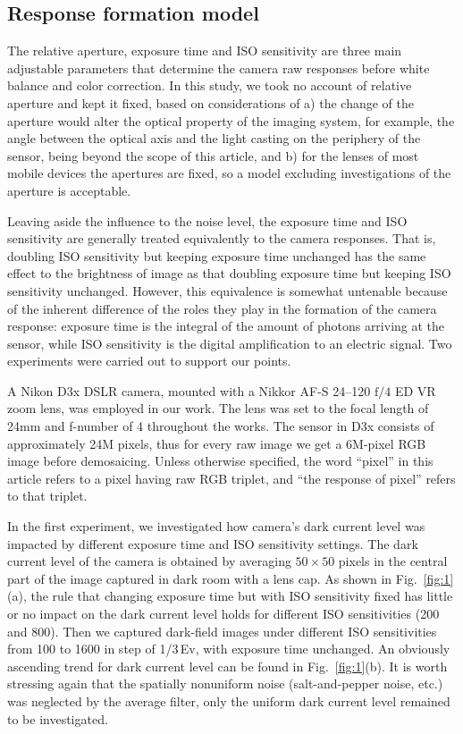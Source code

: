 \documentclass[9pt,twocolumn,twoside]{osajnl}
\begin{document}
	\subsection{Response formation model}\label{sec:response formation model}
	
	The relative aperture, exposure time and ISO sensitivity are three main adjustable parameters that determine the camera raw responses before white balance and color correction. In this study, we took no account of relative aperture and kept it fixed, based on considerations of a) the change of the aperture would alter the optical property of the imaging system, for example, the angle between the optical axis and the light casting on the periphery of the sensor, being beyond the scope of this article, and b) for the lenses of most mobile devices the apertures are fixed, so a model excluding investigations of the aperture is acceptable.
	
	Leaving aside the influence to the noise level, the exposure time and ISO sensitivity are generally treated equivalently to the camera responses. That is, doubling ISO sensitivity but keeping exposure time unchanged has the same effect to the brightness of image as that doubling exposure time but keeping ISO sensitivity unchanged. However, this equivalence is somewhat untenable because of the inherent difference of the roles they play in the formation of the camera response: exposure time is the integral of the amount of photons arriving at the sensor, while ISO sensitivity is the digital amplification to an electric signal. Two experiments were carried out to support our points.
	
	A Nikon D3x DSLR camera, mounted with a Nikkor AF-S 24--120 $\text{f}/4$ ED VR zoom lens, was employed in our work. The lens was set to the focal length of 24mm and f-number of 4 throughout the works. The sensor in D3x consists of approximately 24M pixels, thus for every raw image we get a 6M-pixel RGB image before demosaicing. Unless otherwise specified, the word “pixel” in this article refers to a pixel having raw RGB triplet, and “the response of pixel” refers to that triplet.
	
	In the first experiment, we investigated how camera’s dark current level was impacted by different exposure time and ISO sensitivity settings. The dark current level of the camera is obtained by averaging $50\times50$ pixels in the central part of the image captured in dark room with a lens cap. As shown in Fig.~\ref{fig:1}(a), the rule that changing exposure time but with ISO sensitivity fixed has little or no impact on the dark current level holds for different ISO sensitivities (200 and 800). Then we captured dark-field images under different ISO sensitivities from 100 to 1600 in step of 1/3\,Ev, with exposure time unchanged. An obviously ascending trend for dark current level can be found in Fig.~\ref{fig:1}(b). It is worth stressing again that the spatially nonuniform noise (salt-and-pepper noise, etc.) was neglected by the average filter, only the uniform dark current level remained to be investigated.
	
\end{document}

